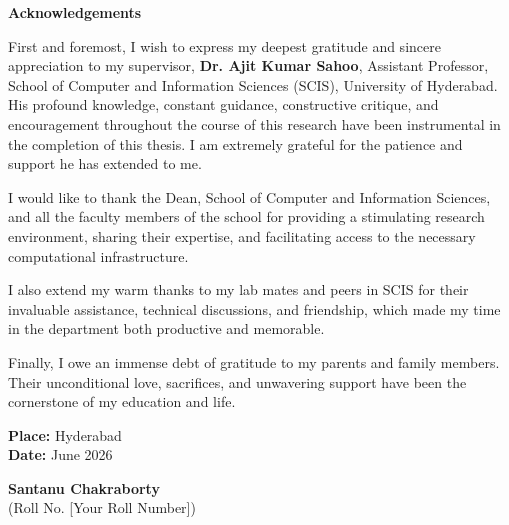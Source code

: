 \newpage
{}
\begin{center}
    \Large\textbf{Acknowledgements}
\end{center}
\vspace{1em}

\begin{onehalfspace}
\noindent
First and foremost, I wish to express my deepest gratitude and sincere appreciation to my supervisor, \textbf{Dr. Ajit Kumar Sahoo}, Assistant Professor, School of Computer and Information Sciences (SCIS), University of Hyderabad. His profound knowledge, constant guidance, constructive critique, and encouragement throughout the course of this research have been instrumental in the completion of this thesis. I am extremely grateful for the patience and support he has extended to me.

\noindent
I would like to thank the Dean, School of Computer and Information Sciences, and all the faculty members of the school for providing a stimulating research environment, sharing their expertise, and facilitating access to the necessary computational infrastructure.

\noindent
I also extend my warm thanks to my lab mates and peers in SCIS for their invaluable assistance, technical discussions, and friendship, which made my time in the department both productive and memorable.

\noindent
Finally, I owe an immense debt of gratitude to my parents and family members. Their unconditional love, sacrifices, and unwavering support have been the cornerstone of my education and life.
\end{onehalfspace}

\vspace{2.5cm}

\noindent
\begin{minipage}[t]{0.45\textwidth}
    \textbf{Place:} Hyderabad \\
    \textbf{Date:} June 2026
\end{minipage}
\hfill
\begin{minipage}[t]{0.45\textwidth}
    \centering
    \textbf{Santanu Chakraborty} \\
    (Roll No. [Your Roll Number])
\end{minipage}

